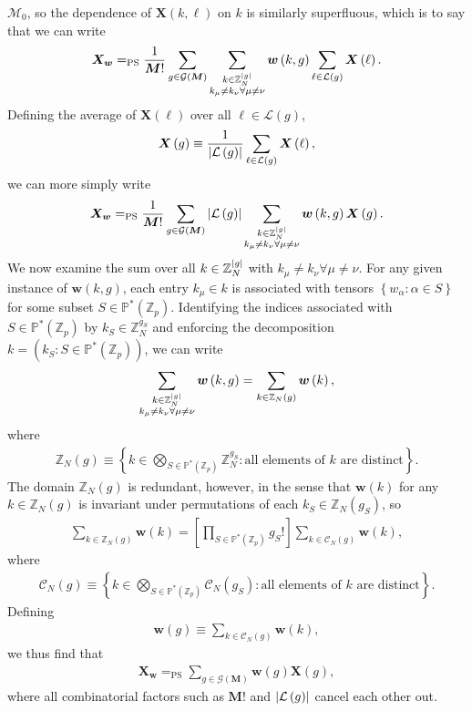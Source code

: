 \documentclass[nofootinbib,notitlepage,11pt]{revtex4-2}
\renewcommand{\t}{\text} %
\newcommand{\f}[2]{\dfrac{#1}{#2}} %
\newcommand{\p}[1]{\left(#1\right)} %
\renewcommand{\sp}[1]{\left[#1\right]} %
\renewcommand{\set}[1]{\left\{#1\right\}} %
\newcommand{\m}{\bm} %
\newcommand{\1}{\mathds{1}}
\newcommand{\C}{\mathcal{C}}
\newcommand{\G}{\mathcal{G}}
\renewcommand{\L}{\mathcal{L}}
\newcommand{\M}{\mathcal{M}}
\newcommand{\PP}{\mathbb{P}}
\newcommand{\ZZ}{\mathbb{Z}}
\newcommand{\EQPS}{=_{\text{PS}}}
\begin{document}
$\M_0$, so the dependence of $\m X\p{k,\ell}$ on $k$ is similarly
superfluous, which is to say that we can write
\begin{align}
  \m X_{\m w}
  \EQPS \f1{\m M!} \sum_{g\in\G\p{\m M}}
  \sum_{\substack{k\in\ZZ_N^{\abs{g}}\\
      k_\mu\ne k_\nu\forall \mu\ne\nu}}
  \m w\p{k,g} \sum_{\ell\in\L\p{g}} \m X\p{\ell}.
\end{align}
Defining the average of $\m X\p{\ell}$ over all $\ell\in\L\p{g}$,
\begin{align}
  \m X\p{g} \equiv \f1{\abs{\L\p{g}}}
  \sum_{\ell\in\L\p{g}} \m X\p{\ell},
\end{align}
we can more simply write
\begin{align}
  \m X_{\m w}
  \EQPS \f1{\m M!} \sum_{g\in\G\p{\m M}} \abs{\L\p{g}}
  \sum_{\substack{k\in\ZZ_N^{\abs{g}}\\
      k_\mu\ne k_\nu\forall \mu\ne\nu}}
  \m w\p{k,g} \m X\p{g}.
\end{align}
We now examine the sum over all $k\in\ZZ_N^{\abs{g}}$ with
$k_\mu\ne k_\nu\forall \mu\ne\nu$.  For any given instance of
$\m w\p{k,g}$, each entry $k_\mu\in k$ is associated with tensors
$\set{w_\alpha:\alpha\in S}$ for some subset $S\in\PP^*\p{\ZZ_p}$.
Identifying the indices associated with $S\in\PP^*\p{\ZZ_p}$ by
$k_S\in\ZZ_N^{g_S}$ and enforcing the decomposition
$k=\p{k_S:S\in\PP^*\p{\ZZ_p}}$, we can write
\begin{align}
  \sum_{\substack{k\in\ZZ_N^{\abs{g}}\\
      k_\mu\ne k_\nu\forall \mu\ne\nu}} \m w\p{k,g}
  = \sum_{k\in\ZZ_N\p{g}} \m w\p{k},
\end{align}
where
\begin{align}
  \ZZ_N\p{g} \equiv
  \set{ k \in \bigotimes_{S\in\PP^*\p{\ZZ_p}} \ZZ_N^{g_S}
    : \t{all elements of $k$ are distinct} }.
\end{align}
The domain $\ZZ_N\p{g}$ is redundant, however, in the sense that
$\m w\p{k}$ for any $k\in\ZZ_N\p{g}$ is invariant under permutations
of each $k_S\in\ZZ_N\p{g_S}$, so
\begin{align}
  \sum_{k\in\ZZ_N\p{g}} \m w\p{k}
  = \sp{\prod_{S\in\PP^*\p{\ZZ_p}}g_S!} \sum_{k\in\C_N\p{g}} \m w\p{k},
\end{align}
where
\begin{align}
  \C_N\p{g} \equiv
  \set{ k \in \bigotimes_{S\in\PP^*\p{\ZZ_p}} \C_N\p{g_S}
    : \t{all elements of $k$ are distinct} }.
\end{align}
Defining
\begin{align}
  \m w\p{g} \equiv \sum_{k\in\C_N\p{g}} \m w\p{k},
  \label{eq:diagram_factors}
\end{align}
we thus find that
\begin{align}
  \m X_{\m w} \EQPS \sum_{g\in\G\p{\m M}} \m w\p{g} \m X\p{g},
  \label{eq:sym_prod_diagrams}
\end{align}
where all combinatorial factors such as $\m M!$ and $\abs{\L\p{g}}$
cancel each other out.
\end{document}
